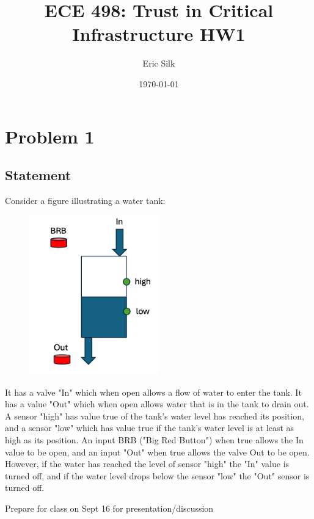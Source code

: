 \documentclass[11pt]{article}
\title{ECE 498: Trust in Critical Infrastructure HW1}
\author{Eric Silk}
\date{\today}
\begin{document}
\maketitle
\pagebreak


\section*{Problem 1}
\subsection*{Statement}
Consider a figure illustrating a water tank:

\begin{figure}[h]
    \begin{center}
        \includegraphics[width=0.5\textwidth]{water_tank.png}
    \end{center}
\end{figure}

\noindent
It has a valve "In" which when open allows a flow of water to enter the tank. It
has a value "Out" which when open allows water that is in the tank to drain out.
A sensor "high" has value true of the tank's water level has reached its
position, and a sensor "low" which has value true if the tank's water level is
at least as high as its position. An input BRB ("Big Red Button") when true
allows the In value to be open, and an input "Out" when true allows the valve
Out to be open. However, if the water has reached the level of sensor "high" the
"In" value is turned off, and if the water level drops below the sensor "low"
the "Out" sensor is turned off.

Prepare for class on Sept 16 for presentation/discussion
\end{document}
